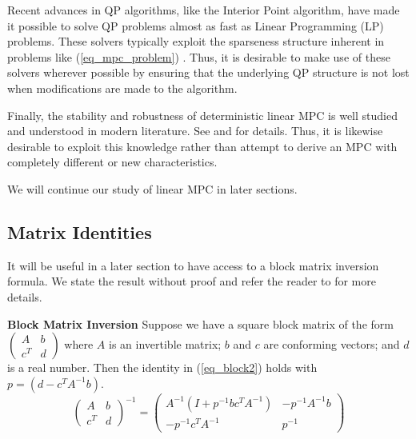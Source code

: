 Recent advances in QP algorithms, like the Interior Point algorithm, have made it possible to solve QP problems almost as fast as Linear Programming (LP) problems. These solvers typically exploit the sparseness structure inherent in problems like (\ref{eq_mpc_problem}) \cite{mac}. Thus, it is desirable to make use of these solvers wherever possible by ensuring that the underlying QP structure is not lost when modifications are made to the algorithm.

Finally, the stability and robustness of deterministic linear MPC is well studied and understood in modern literature. See \cite{raw} and \cite{mac} for details. Thus, it is likewise desirable to exploit this knowledge rather than attempt to derive an MPC with completely different or new characteristics.

We will continue our study of linear MPC in later sections.

\subsection{Matrix Identities}
\label{sec_block}
It will be useful in a later section to have access to a block matrix inversion formula. We state the result without proof and refer the reader to \cite{jang} for more details.
\begin{thrm}
\textbf{Block Matrix Inversion} Suppose we have a square block matrix of the form $\begin{pmatrix}
A & b \\ c^T & d
\end{pmatrix}
$ where $A$ is an invertible matrix; $b$ and $c$ are conforming vectors; and $d$ is a real number. Then the identity in (\ref{eq_block2}) holds with $p = (d-c^TA^{-1}b)$.
\begin{equation}
\begin{pmatrix}
A & b \\ c^T & d
\end{pmatrix}^{-1} = \begin{pmatrix}
A^{-1}(I+p^{-1}bc^TA^{-1}) & -p^{-1}A^{-1}b \\ -p^{-1}c^TA^{-1} & p^{-1}
\end{pmatrix}
\label{eq_block2}
\end{equation}
\label{thrm_block_inv}
\end{thrm}